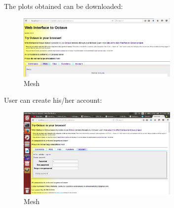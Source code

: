  The plots obtained can be downloaded:\\
 \begin{figure}[!ht]
 	\centering
 	\includegraphics[width=0.7\textwidth]{images/download.png}                
 	\caption{Mesh}
 	\hspace{-1.5em}
 \end{figure}
 \newpage
 User can create his/her account:
 \begin{figure}[!ht]
 	\centering
 	\includegraphics[width=0.7\textwidth]{images/account.png}                
 	\caption{Mesh}
 	\hspace{-1.5em}
 \end{figure}
 
 
 
 
 